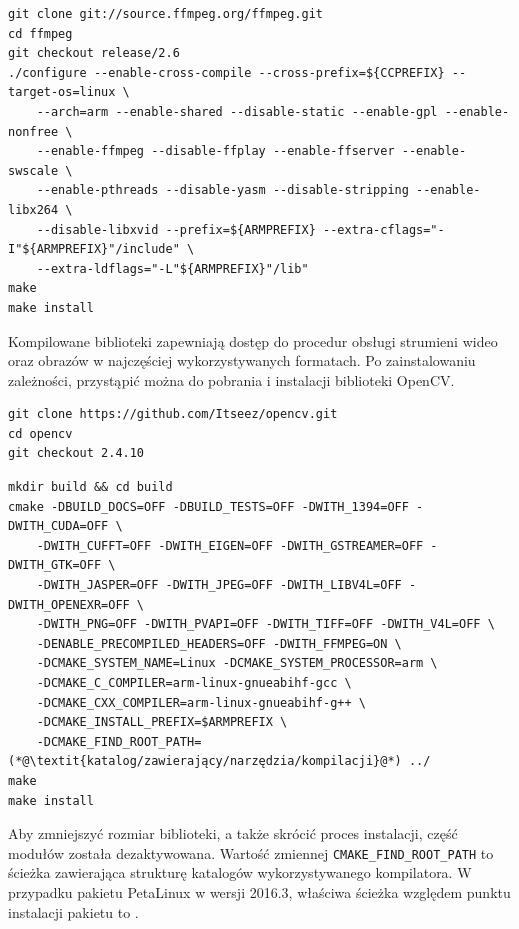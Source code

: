 \begin{lstlisting}[breaklines=true, caption=Kompilacja biblioteki \textit{ffmpeg}.]
git clone git://source.ffmpeg.org/ffmpeg.git
cd ffmpeg
git checkout release/2.6
./configure --enable-cross-compile --cross-prefix=${CCPREFIX} --target-os=linux \
	--arch=arm --enable-shared --disable-static --enable-gpl --enable-nonfree \
	--enable-ffmpeg --disable-ffplay --enable-ffserver --enable-swscale \
	--enable-pthreads --disable-yasm --disable-stripping --enable-libx264 \
	--disable-libxvid --prefix=${ARMPREFIX} --extra-cflags="-I"${ARMPREFIX}"/include" \
	--extra-ldflags="-L"${ARMPREFIX}"/lib"
make
make install
\end{lstlisting}

Kompilowane biblioteki zapewniają dostęp do procedur obsługi strumieni wideo oraz obrazów w najczęściej wykorzystywanych formatach.
Po zainstalowaniu zależności, przystąpić można do pobrania i instalacji biblioteki OpenCV.

\begin{lstlisting}[breaklines=true, caption=Pobieranie biblioteki OpenCV w wersji 2.4.10.]
git clone https://github.com/Itseez/opencv.git
cd opencv
git checkout 2.4.10
\end{lstlisting}

\begin{lstlisting}[breaklines=true, caption=Kompilacja biblioteki \textit{OpenCV}.]
mkdir build && cd build
cmake -DBUILD_DOCS=OFF -DBUILD_TESTS=OFF -DWITH_1394=OFF -DWITH_CUDA=OFF \
	-DWITH_CUFFT=OFF -DWITH_EIGEN=OFF -DWITH_GSTREAMER=OFF -DWITH_GTK=OFF \
	-DWITH_JASPER=OFF -DWITH_JPEG=OFF -DWITH_LIBV4L=OFF -DWITH_OPENEXR=OFF \
	-DWITH_PNG=OFF -DWITH_PVAPI=OFF -DWITH_TIFF=OFF -DWITH_V4L=OFF \
	-DENABLE_PRECOMPILED_HEADERS=OFF -DWITH_FFMPEG=ON \
	-DCMAKE_SYSTEM_NAME=Linux -DCMAKE_SYSTEM_PROCESSOR=arm \
	-DCMAKE_C_COMPILER=arm-linux-gnueabihf-gcc \
	-DCMAKE_CXX_COMPILER=arm-linux-gnueabihf-g++ \
	-DCMAKE_INSTALL_PREFIX=$ARMPREFIX \
	-DCMAKE_FIND_ROOT_PATH=(*@\textit{katalog/zawierający/narzędzia/kompilacji}@*) ../
make
make install
\end{lstlisting}

Aby zmniejszyć rozmiar biblioteki, a także skrócić proces instalacji, część modułów została dezaktywowana. 
Wartość zmiennej \texttt{CMAKE\_FIND\_ROOT\_PATH} to ścieżka zawierająca strukturę katalogów wykorzystywanego kompilatora. 
W przypadku pakietu PetaLinux w wersji 2016.3, właściwa ścieżka względem punktu instalacji pakietu to .

